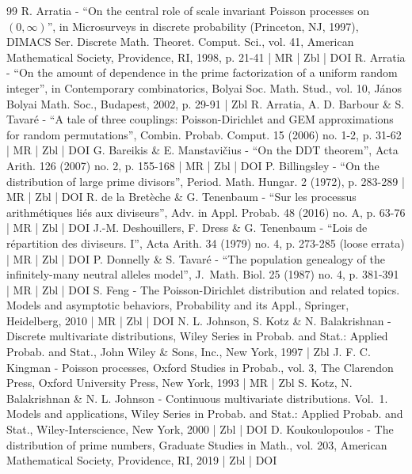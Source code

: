 \begin{thebibliography}{99}
R. Arratia - “On the central role of scale invariant Poisson processes on $(0,\infty )$”, in Microsurveys in discrete probability (Princeton, NJ, 1997), DIMACS Ser. Discrete Math. Theoret. Comput. Sci., vol. 41, American Mathematical Society, Providence, RI, 1998, p. 21-41 | MR | Zbl | DOI
R. Arratia - “On the amount of dependence in the prime factorization of a uniform random integer”, in Contemporary combinatorics, Bolyai Soc. Math. Stud., vol. 10, János Bolyai Math. Soc., Budapest, 2002, p. 29-91 | Zbl
R. Arratia, A. D. Barbour \& S. Tavaré - “A tale of three couplings: Poisson-Dirichlet and GEM approximations for random permutations”, Combin. Probab. Comput. 15 (2006) no. 1-2, p. 31-62 | MR | Zbl | DOI
G. Bareikis \& E. Manstavičius - “On the DDT theorem”, Acta Arith. 126 (2007) no. 2, p. 155-168 | MR | Zbl | DOI
P. Billingsley - “On the distribution of large prime divisors”, Period. Math. Hungar. 2 (1972), p. 283-289 | MR | Zbl | DOI
R. de la Bretèche \& G. Tenenbaum - “Sur les processus arithmétiques liés aux diviseurs”, Adv. in Appl. Probab. 48 (2016) no. A, p. 63-76 | MR | Zbl | DOI
J.-M. Deshouillers, F. Dress \& G. Tenenbaum - “Lois de répartition des diviseurs. I”, Acta Arith. 34 (1979) no. 4, p. 273-285 (loose errata) | MR | Zbl | DOI
P. Donnelly \& S. Tavaré - “The population genealogy of the infinitely-many neutral alleles model”, J. Math. Biol. 25 (1987) no. 4, p. 381-391 | MR | Zbl | DOI
S. Feng - The Poisson-Dirichlet distribution and related topics. Models and asymptotic behaviors, Probability and its Appl., Springer, Heidelberg, 2010 | MR | Zbl | DOI
N. L. Johnson, S. Kotz \& N. Balakrishnan - Discrete multivariate distributions, Wiley Series in Probab. and Stat.: Applied Probab. and Stat., John Wiley \& Sons, Inc., New York, 1997 | Zbl
J. F. C. Kingman - Poisson processes, Oxford Studies in Probab., vol. 3, The Clarendon Press, Oxford University Press, New York, 1993 | MR | Zbl
S. Kotz, N. Balakrishnan \& N. L. Johnson - Continuous multivariate distributions. Vol. 1. Models and applications, Wiley Series in Probab. and Stat.: Applied Probab. and Stat., Wiley-Interscience, New York, 2000 | Zbl | DOI
D. Koukoulopoulos - The distribution of prime numbers, Graduate Studies in Math., vol. 203, American Mathematical Society, Providence, RI, 2019 | Zbl | DOI

\end{thebibliography}
